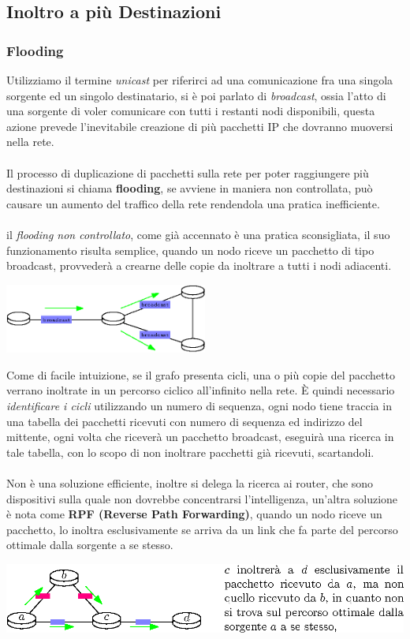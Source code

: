 \documentclass[12pt, letterpaper]{article}
\newcommand{\acc}{\\\hphantom{}\\}
\begin{document}
\subsection{Inoltro a più Destinazioni}
\subsubsection{Flooding}
Utilizziamo il termine \textit{unicast} per riferirci ad una comunicazione fra una singola sorgente ed un
singolo destinatario, si è poi parlato di \textit{broadcast}, ossia l'atto di una sorgente di voler comunicare con 
tutti i restanti nodi disponibili, questa azione prevede l'inevitabile creazione di più pacchetti IP che dovranno 
muoversi nella rete.\acc 
Il processo di duplicazione di pacchetti sulla rete per poter raggiungere più destinazioni si chiama \textbf{flooding}, 
se avviene in maniera non controllata, può causare un aumento del traffico della rete rendendola una 
pratica inefficiente.\acc 
il \textit{flooding non controllato}, come già accennato è una pratica sconsigliata, il suo funzionamento risulta 
semplice, quando un nodo riceve un pacchetto di tipo broadcast, provvederà a crearne delle copie da inoltrare a tutti 
i nodi adiacenti.\begin{center}
    \includegraphics[width=0.5\textwidth ]{images/UncontrolledFlooding.eps}
\end{center}
Come di facile intuizione, se il grafo presenta cicli, una o più copie del pacchetto verrano inoltrate in un percorso 
ciclico all'infinito nella rete. È quindi necessario \textit{identificare i cicli} utilizzando un numero di sequenza, 
ogni nodo tiene traccia in una tabella dei pacchetti ricevuti con numero di sequenza ed indirizzo del mittente, ogni volta 
che riceverà un pacchetto broadcast, eseguirà una ricerca in tale tabella, con lo scopo di non inoltrare pacchetti 
già ricevuti, scartandoli.\acc 
Non è una soluzione efficiente, inoltre si delega la ricerca ai router, che sono dispositivi sulla quale non dovrebbe 
concentrarsi l'intelligenza, un'altra soluzione è nota come \textbf{RPF (Reverse Path Forwarding)}, quando un nodo
riceve un pacchetto, lo inoltra esclusivamente se arriva da un link che fa parte del percorso ottimale dalla 
sorgente a se stesso.\begin{center}
    \includegraphics[width=\textwidth ]{images/RPF.eps}
\end{center} 
\end{document}
